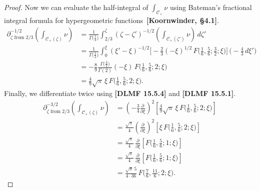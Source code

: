 \documentclass[11pt,a4paper,twoside,leqno,noamsfonts]{amsart}
\numberwithin{equation}{section}
\begin{document}
\begin{example}[Airy]
\begin{proof}
Now we can evaluate the half-integral of $\int_{\mathcal{C}_+} \nu$ using Bateman's fractional integral formula for hypergeometric functions~\textbf{[Koornwinder, \S 4.1]}.
\begin{align*}
\partial^{-1/2}_{\zeta \text{ from } 2/3} \left( \int_{\mathcal{C}_+(\zeta)} \nu \right) & = \frac{1}{\Gamma\big(\tfrac{1}{2}\big)} \int_{2/3}^\zeta (\zeta - \zeta')^{-1/2} \left( \int_{\mathcal{C}_+(\zeta')} \nu \right)\,d\zeta' \\
& = \frac{1}{\Gamma\big(\tfrac{1}{2}\big)} \int_0^\xi (\xi' - \xi)^{-1/2} \Big[ -\tfrac{2}{3} (-\xi)^{1/2}\,F\big(\tfrac{1}{6}, \tfrac{5}{6}; \tfrac{3}{2}; \xi\big) \Big] \,\big( -\tfrac{4}{3}\,d\xi' \big) \\
& = -\frac{8}{9} \frac{\Gamma\big(\tfrac{3}{2}\big)}{\Gamma(2)} (-\xi)\,F\big(\tfrac{1}{6}, \tfrac{5}{6}; 2; \xi\big) \\
& = \frac{4}{9} \sqrt{\pi}\,\xi\,F\big(\tfrac{1}{6}, \tfrac{5}{6}; 2; \xi\big).
\end{align*}
Finally, we differentiate twice using \textbf{[DLMF 15.5.4]} and \textbf{[DLMF 15.5.1]}.
\begin{align*}
\partial^{-3/2}_{\zeta \text{ from } 2/3} \left( \int_{\mathcal{C}_+(\zeta)} \nu \right) & = \left(-\tfrac{3}{4} \tfrac{\partial}{\partial \xi}\right)^2 \left[ \frac{4}{9} \sqrt{\pi}\,\xi\,F\big(\tfrac{1}{6}, \tfrac{5}{6}; 2; \xi\big) \right] \\
& = \tfrac{\sqrt{\pi}}{4} \left(\tfrac{\partial}{\partial \xi}\right)^2 \left[ \xi\,F\big(\tfrac{1}{6}, \tfrac{5}{6}; 2; \xi\big) \right] \\
& = \tfrac{\sqrt{\pi}}{4}\,\tfrac{\partial}{\partial \xi} \left[ F\big(\tfrac{1}{6}, \tfrac{5}{6}; 1; \xi\big) \right] \\
& = \tfrac{\sqrt{\pi}}{4}\,\tfrac{\partial}{\partial \xi} \left[ F\big(\tfrac{1}{6}, \tfrac{5}{6}; 1; \xi\big) \right] \\
& = \tfrac{\sqrt{\pi}\,5}{4 \cdot 36}\,F\big(\tfrac{7}{6}, \tfrac{11}{6}; 2; \xi\big).
\end{align*}
\end{proof}


\end{example}
\end{document}

